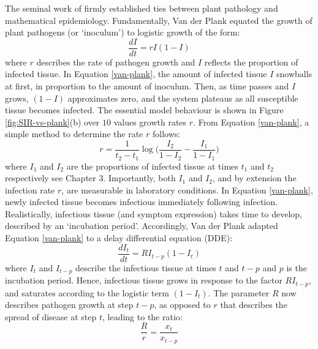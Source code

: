 The seminal work of \cite{van2013plant} firmly established ties between plant pathology and 
mathematical epidemiology.
Fundamentally, Van der Plank equated the growth of plant pathogens (or `inoculum') to logistic growth of the form:
\begin{equation}
    \label{van-plank}
    \frac{dI}{dt} = rI(1 - I)
\end{equation}
where $r$ describes the rate of pathogen growth and $I$ reflects the proportion of infected tissue.
In Equation \ref{van-plank}, the amount of infected tissue $I$ snowballs at first, 
in proportion to the amount of inoculum. Then, as time passes and $I$ grows, $(1-I)$ approximates zero, 
and the system plateaus as all susceptible tissue becomes infected.
The essential model behaviour is shown in Figure \ref{fig:SIR-vs-plank}(b) over $10$ values growth rates $r$.
From Equation \ref{van-plank}, a simple method to determine the rate $r$ follows:
\begin{equation}
    \label{eq:van-plank-r}
    r =\frac{1}{t_2 - t_1} \log \Big(\frac{I_2}{1 - I_2} - \frac{I_1}{1 - I_1}\Big)
\end{equation}
where $I_1$ and $I_2$ are the proportions of infected tissue at times $t_1$ and $t_2$ respectively\textemdash 
see \cite{van2013plant} Chapter 3. Importantly, both $I_1$ and $I_2$, and by extension the infection rate $r$,
are measurable in laboratory conditions. 
In Equation \ref{van-plank}, newly infected tissue becomes infectious immediately following infection.
Realistically, infectious tissue (and symptom expression) takes time to develop, described by an `incubation period'.
Accordingly, Van der Plank adapted Equation \ref{van-plank} to a delay differential equation (DDE):
\begin{equation}
\label{van-plank-incubation}
    \frac{dI_t}{dt} = RI_{t-p}(1 - I_{t})
\end{equation}
where $I_t$ and $I_{t-p}$ describe the infectious tissue at times $t$ and $t-p$ and $p$ is the incubation period. 
Hence, infectious tissue grows in response to the factor $R I_{t-p}$, and saturates
according to the logistic term $(1 - I_t)$. The parameter $R$ now describes pathogen
growth at step $t-p$, as opposed to $r$ that describes the spread of disease at step $t$, leading to the ratio:
\begin{equation}
    \frac{R}{r} = \frac{x_t}{x_{t-p}}
\end{equation}
